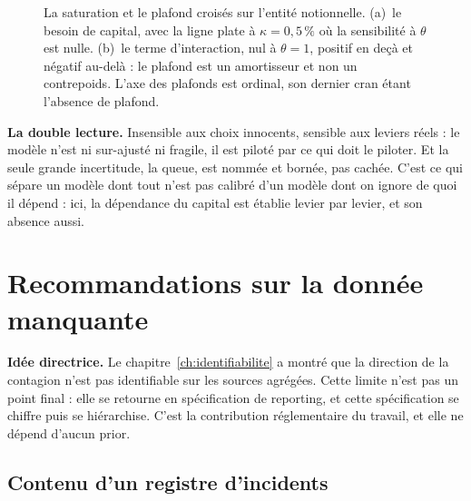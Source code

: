 \begin{figure}[H]\centering
{}
\caption{La saturation et le plafond croisés sur l'entité notionnelle. (a)~le besoin de capital,
avec la ligne plate à $\kappa = 0{,}5\,\%$ où la sensibilité à $\theta$ est nulle. (b)~le terme
d'interaction, nul à $\theta = 1$, positif en deçà et négatif au-delà : le plafond est un
amortisseur et non un contrepoids. L'axe des plafonds est ordinal, son dernier cran étant l'absence
de plafond.}
\label{fig:plafond-saturation-corps}
\end{figure}

\vspace{2pt}


\begin{cle}
\textbf{La double lecture.} \og Insensible aux choix innocents, sensible aux leviers réels \fg :
le modèle n'est ni sur-ajusté ni fragile, il est piloté par ce qui doit le piloter.
Et la seule grande incertitude, la queue, est nommée et bornée, pas cachée. C'est ce qui
sépare un modèle dont tout n'est pas calibré d'un modèle dont on ignore de quoi il dépend :
ici, la dépendance du capital est établie levier par levier, et son absence aussi.
\end{cle}


\section{Recommandations sur la donnée manquante}

\begin{cle}
\textbf{Idée directrice.} Le chapitre~\ref{ch:identifiabilite} a montré que la direction de la
contagion n'est pas identifiable sur les sources agrégées. Cette limite n'est pas un point final :
elle se retourne en spécification de reporting, et cette spécification se chiffre
puis se hiérarchise. C'est la contribution réglementaire du travail, et elle ne dépend
d'aucun prior.
\end{cle}

\subsection{Contenu d'un registre d'incidents}

